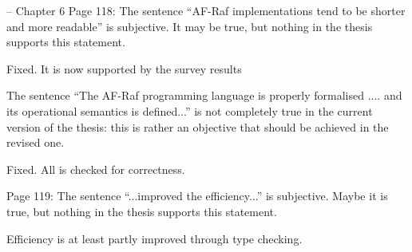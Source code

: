 \documentclass{article}
\newenvironment{them}{\noindent\begingroup\color{blue}}{\endgroup\par}
\begin{document}
\begin{them}

-- Chapter 6
Page 118:
The sentence “AF-Raf implementations tend to be shorter and more readable” is
subjective. It may be true, but nothing in the thesis supports this statement.

\end{them}
Fixed. It is now supported by the survey results

\begin{them}

The sentence “The AF-Raf programming language is properly formalised .... and
its operational semantics is defined...” is not completely true in the current
version of the thesis: this is rather an objective that should be achieved in
the revised one.

\end{them}
Fixed. All is checked for correctness.

\begin{them}

Page 119:
The sentence “...improved the efficiency...” is subjective. Maybe it is true,
but nothing in the thesis supports this statement.

\end{them}
Efficiency is at least partly improved through type checking.
\end{document}
